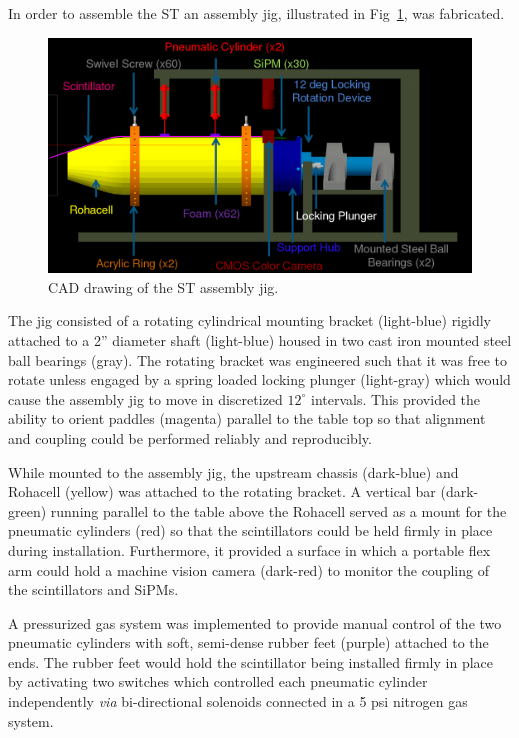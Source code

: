 In order to assemble the ST an assembly jig, illustrated in Fig~\ref{fig:ajcaddrawing}, was fabricated.  
	\begin{figure}[!htb]
		\centering
		\includegraphics[width=1.0\columnwidth]{fabrication/figs/aj_cad_drawing}
		\caption{CAD drawing of the ST assembly jig.}
		\label{fig:ajcaddrawing}
	\end{figure}
The jig consisted of a rotating cylindrical mounting bracket (light-blue) rigidly attached to a 2'' diameter shaft (light-blue) housed in two cast iron mounted steel ball bearings (gray).  The rotating bracket was engineered such that it was free to rotate unless engaged by a spring loaded locking plunger (light-gray) which would cause the assembly jig to move in discretized $12^{\circ}$ intervals.  This provided the ability to orient paddles (magenta) parallel to the table top so that alignment and coupling could be performed reliably and reproducibly.

While mounted to the assembly jig, the upstream chassis (dark-blue) and Rohacell (yellow) was attached to the rotating bracket.  A vertical bar (dark-green) running parallel to the table above the Rohacell served as a mount for the pneumatic cylinders (red) so that the scintillators could be held firmly in place during installation.  Furthermore, it provided a surface in which a portable flex arm could hold a machine vision camera (dark-red) to monitor the coupling of the scintillators and SiPMs.

A pressurized gas system was implemented to provide manual control of the two pneumatic cylinders with soft, semi-dense rubber feet (purple) attached to the ends.  The rubber feet would hold the scintillator being installed firmly in place by activating two switches which controlled each pneumatic cylinder independently \textit{via} bi-directional solenoids connected in a 5 psi nitrogen gas system.

